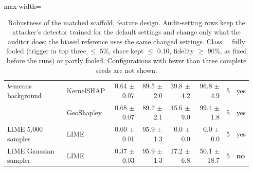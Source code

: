 \begin{table}[t]
\begin{adjustbox}{max width=\linewidth}
\begin{tabular}{llrrrrrl}
\midrule
$k$-means background & KernelSHAP & 0.64 $\pm$ 0.07 & 89.5 $\pm$ 2.0 & 39.8 $\pm$ 4.2 & 96.8 $\pm$ 4.9 & 5 & yes \\
 & GeoShapley & 0.68 $\pm$ 0.07 & 89.7 $\pm$ 2.1 & 45.6 $\pm$ 9.0 & 99.4 $\pm$ 1.8 & 5 & yes \\
\midrule
LIME 5,000 samples & LIME & 0.00 $\pm$ 0.01 & 95.9 $\pm$ 1.3 & 0.0 $\pm$ 0.0 & 0.0 $\pm$ 0.0 & 5 & yes \\
\midrule
LIME Gaussian sampler & LIME & 0.37 $\pm$ 0.03 & 95.9 $\pm$ 1.3 & 17.2 $\pm$ 6.8 & 50.1 $\pm$ 18.7 & 5 & \textbf{no} \\
\bottomrule
\end{tabular}
\end{adjustbox}
\caption{Robustness of the matched scaffold, feature design. Audit-setting rows keep the attacker's detector trained for the default settings and change only what the auditor does; the biased reference uses the same changed settings. Class = fully fooled (trigger in top three $\le$ 5\%, share kept $\le$ 0.10, fidelity $\ge$ 90\%, as fixed before the runs) or partly fooled. Configurations with fewer than three complete seeds are not shown.}
\label{tab:robust}
\end{table}
